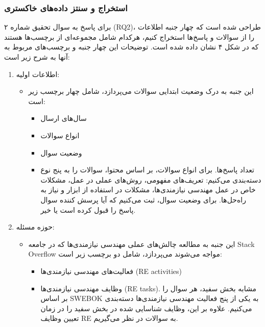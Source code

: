 \documentclass[a4paper,10pt]{article}
\begin{document}
                \subsubsection{استخراج و سنتز داده‌های خاکستری}

                    برای پاسخ به سوال تحقیق شماره ۲ (RQ2)، طراحی شده است که چهار جنبه اطلاعات را از سوالات و پاسخ‌ها استخراج کنیم، هرکدام شامل مجموعه‌ای از برچسب‌ها هستند که در شکل ۴ نشان داده شده است. توضیحات این چهار جنبه و برچسب‌های مربوط به آنها به شرح زیر است:

                    \begin{enumerate}
                        \item اطلاعات اولیه:
                        \begin{itemize}
                            \item این جنبه به درک وضعیت ابتدایی سوالات می‌پردازد، شامل چهار برچسب زیر است:
                            \begin{itemize}
                                \item سال‌های ارسال
                                \item انواع سوالات
                                \item وضعیت سوال
                                \item تعداد پاسخ‌ها. برای انواع سوالات، بر اساس محتوا، سوالات را به پنج نوع دسته‌بندی می‌کنیم: تعریف‌های مفهومی، روش‌های عملی در عمل، مشکلات خاص در عمل مهندسی نیازمندی‌ها، مشکلات در استفاده از ابزار و نیاز به راه‌حل‌ها. برای وضعیت سوال، ثبت می‌کنیم که آیا پرسش کننده سوال پاسخ را قبول کرده است یا خیر.
                            \end{itemize}
                        \end{itemize}
                        
                        \item حوزه مسئله:
                        \begin{itemize}
                            \item این جنبه به مطالعه چالش‌های عملی مهندسی نیازمندی‌ها که در جامعه Stack Overflow مواجه می‌شوند می‌پردازد، شامل دو برچسب زیر است:
                            \begin{itemize}
                                \item فعالیت‌های مهندسی نیازمندی‌ها (RE activities)
                                \item وظایف مهندسی نیازمندی‌ها (RE tasks). مشابه بخش سفید، هر سوال را بر اساس SWEBOK به یکی از پنج فعالیت مهندسی نیازمندی‌ها دسته‌بندی می‌کنیم. علاوه بر این، وظایف شناسایی شده در بخش سفید را در زمان تعیین وظایف RE به سوالات در نظر می‌گیریم.
                            \end{itemize}
                        \end{itemize}
                        

\end{enumerate}
\end{document}
